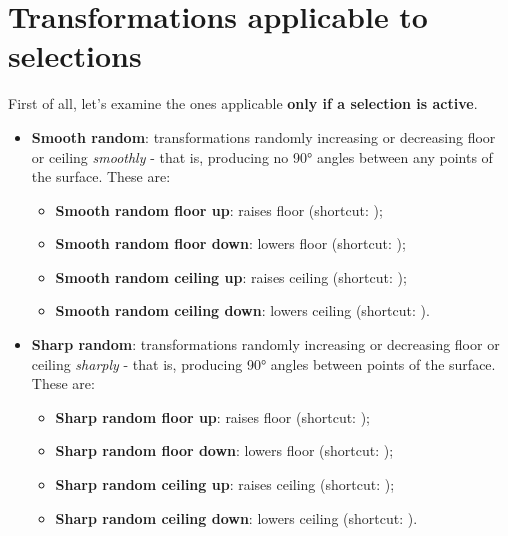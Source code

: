 \section{Transformations applicable to selections}

First of all, let's examine the ones applicable \textbf{only if a selection is active}.

\begin{itemize}
    \item \textbf{Smooth random}: transformations randomly increasing or decreasing floor or ceiling \emph{smoothly} - that is, producing no 90° angles between any points of the surface. These are:
    \begin{itemize}
        \item \textbf{Smooth random floor up}: raises floor (shortcut: );
        \item \textbf{Smooth random floor down}: lowers floor (shortcut: );
        \item \textbf{Smooth random ceiling up}: raises ceiling (shortcut: );
        \item \textbf{Smooth random ceiling down}: lowers ceiling (shortcut: ).
    \end{itemize}
    \item \textbf{Sharp random}: transformations randomly increasing or decreasing floor or ceiling \emph{sharply} - that is, producing 90° angles between points of the surface. These are:
    \begin{itemize}
        \item \textbf{Sharp random floor up}: raises floor (shortcut: );
        \item \textbf{Sharp random floor down}: lowers floor (shortcut: );
        \item \textbf{Sharp random ceiling up}: raises ceiling (shortcut: );
        \item \textbf{Sharp random ceiling down}: lowers ceiling (shortcut: ).
    \end{itemize}
\end{itemize}


